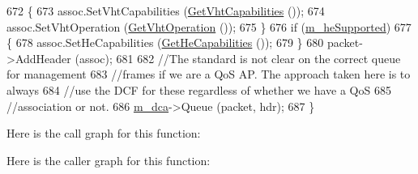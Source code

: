 \begin{DoxyCode}
672     \{
673       assoc.SetVhtCapabilities (\hyperlink{classns3_1_1RegularWifiMac_ade487870f5663694d30a2dd6a7e614e8}{GetVhtCapabilities} ());
674       assoc.SetVhtOperation (\hyperlink{classns3_1_1ApWifiMac_afde045b9f011d312e3110bb5b9411403}{GetVhtOperation} ());
675     \}
676   \textcolor{keywordflow}{if} (\hyperlink{classns3_1_1RegularWifiMac_a9458143c722fa0b6e5d223d41585842a}{m\_heSupported})
677     \{
678       assoc.SetHeCapabilities (\hyperlink{classns3_1_1RegularWifiMac_aea22761a20fdff9f6c1a9acc49d63700}{GetHeCapabilities} ());
679     \}
680   packet->AddHeader (assoc);
681 
682   \textcolor{comment}{//The standard is not clear on the correct queue for management}
683   \textcolor{comment}{//frames if we are a QoS AP. The approach taken here is to always}
684   \textcolor{comment}{//use the DCF for these regardless of whether we have a QoS}
685   \textcolor{comment}{//association or not.}
686   \hyperlink{classns3_1_1RegularWifiMac_a152965c3def1a308b088b37c2c88a1a2}{m\_dca}->Queue (packet, hdr);
687 \}
\end{DoxyCode}


Here is the call graph for this function\+:




Here is the caller graph for this function\+:


